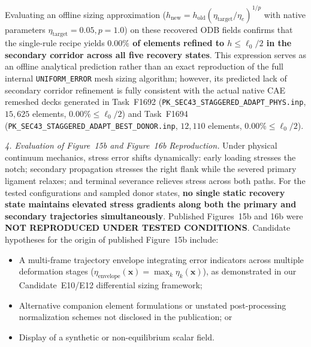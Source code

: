 Evaluating an offline sizing approximation ($h_{\mathrm{new}} = h_{\mathrm{old}}(\eta_{\mathrm{target}}/\eta_e)^{1/p}$ with native parameters $\eta_{\mathrm{target}} = 0.05, p = 1.0$) on these recovered ODB fields confirms that the single-rule recipe yields \textbf{$0.00\%$ of elements refined to $h \le \ell_0/2$ in the secondary corridor across all five recovery states}. This expression serves as an offline analytical prediction rather than an exact reproduction of the full internal \Abaqus \texttt{UNIFORM\_ERROR} mesh sizing algorithm; however, its predicted lack of secondary corridor refinement is fully consistent with the actual native CAE remeshed decks generated in Task~F1692 (\texttt{PK\_SEC43\_STAGGERED\_ADAPT\_PHYS.inp}, $15{,}625$ elements, $0.00\% \le \ell_0/2$) and Task~F1694 (\texttt{PK\_SEC43\_STAGGERED\_ADAPT\_BEST\_DONOR.inp}, $12{,}110$ elements, $0.00\% \le \ell_0/2$).

\textit{4. Evaluation of Figure~15b and Figure~16b Reproduction.}
Under physical continuum mechanics, stress error shifts dynamically: early loading stresses the notch; secondary propagation stresses the right flank while the severed primary ligament relaxes; and terminal severance relieves stress across both paths. For the tested configurations and sampled donor states, \textbf{no single static recovery state maintains elevated stress gradients along both the primary and secondary trajectories simultaneously}. Published Figures~15b and 16b were \textbf{NOT REPRODUCED UNDER TESTED CONDITIONS}. Candidate hypotheses for the origin of published Figure~15b include:
\begin{itemize}
  \item A multi-frame trajectory envelope integrating error indicators across multiple deformation stages ($\eta_{\mathrm{envelope}}(\mathbf{x}) = \max_k \eta_k(\mathbf{x})$), as demonstrated in our Candidate~E10/E12 differential sizing framework;
  \item Alternative companion element formulations or unstated post-processing normalization schemes not disclosed in the publication; or
  \item Display of a synthetic or non-equilibrium scalar field.
\end{itemize}

